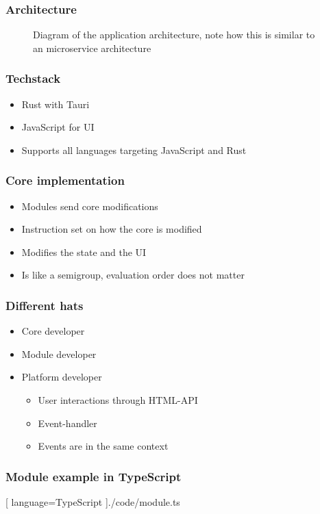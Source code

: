 \begin{frame}
  \frametitle{Architecture}
  \begin{figure}[H]
    \centering
    
    \caption{
      Diagram of the application architecture, note how this is similar to an
      microservice architecture
    }
  \end{figure}
\end{frame}

\begin{frame}
  \frametitle{Techstack}
  \begin{itemize}
    \item Rust with Tauri
    \item JavaScript for UI
    \item Supports all languages targeting JavaScript and Rust
  \end{itemize}
\end{frame}

\begin{frame}
  \frametitle{Core implementation}
  \begin{itemize}
    \item Modules send core modifications
    \item Instruction set on how the core is modified
    \item Modifies the state and the UI
    \item Is like a semigroup, evaluation order does not matter
  \end{itemize}
\end{frame}

\begin{frame}
  \frametitle{Different hats}
  \begin{itemize}
    \item Core developer
    \item Module developer
    \item Platform developer
      \begin{itemize}
        \item User interactions through HTML-API
        \item Event-handler
        \item Events are in the same context
      \end{itemize}
  \end{itemize}
\end{frame}

\begin{frame}
  \frametitle{Module example in TypeScript}
  \begin{center}
    
    [ language=TypeScript
    ]{./code/module.ts}
  \end{center}
\end{frame}


